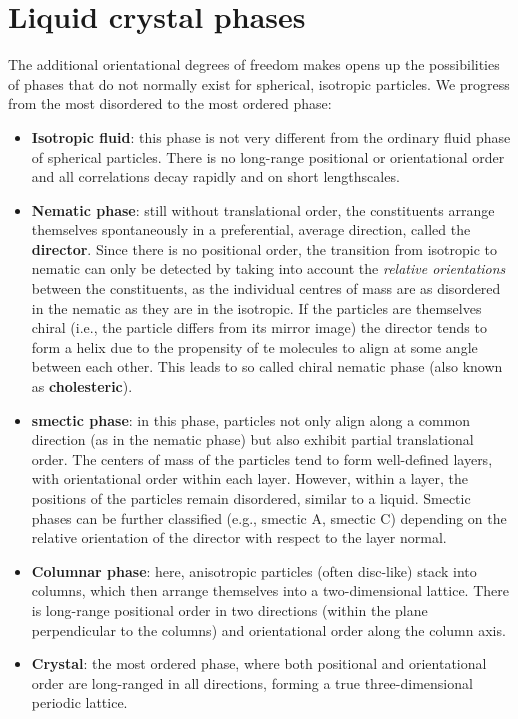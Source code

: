 \documentclass[
  letterpaper,
  enabledeprecatedfontcommands]{report}
\providecommand{\tightlist}{%
  \setlength{\itemsep}{0pt}\setlength{\parskip}{0pt}}
\begin{document}
\section{Liquid crystal phases}\label{liquid-crystal-phases}

The additional orientational degrees of freedom makes opens up the
possibilities of phases that do not normally exist for spherical,
isotropic particles. We progress from the most disordered to the most
ordered phase:

\begin{itemize}
\tightlist
\item
  \textbf{Isotropic fluid}: this phase is not very different from the
  ordinary fluid phase of spherical particles. There is no long-range
  positional or orientational order and all correlations decay rapidly
  and on short lengthscales.
\item
  \textbf{Nematic phase}: still without translational order, the
  constituents arrange themselves spontaneously in a preferential,
  average direction, called the \textbf{director}. Since there is no
  positional order, the transition from isotropic to nematic can only be
  detected by taking into account the \emph{relative orientations}
  between the constituents, as the individual centres of mass are as
  disordered in the nematic as they are in the isotropic. If the
  particles are themselves chiral (i.e., the particle differs from its
  mirror image) the director tends to form a helix due to the propensity
  of te molecules to align at some angle between each other. This leads
  to so called chiral nematic phase (also known as
  \textbf{cholesteric}).
\item
  \textbf{smectic phase}: in this phase, particles not only align along
  a common direction (as in the nematic phase) but also exhibit partial
  translational order. The centers of mass of the particles tend to form
  well-defined layers, with orientational order within each layer.
  However, within a layer, the positions of the particles remain
  disordered, similar to a liquid. Smectic phases can be further
  classified (e.g., smectic A, smectic C) depending on the relative
  orientation of the director with respect to the layer normal.
\item
  \textbf{Columnar phase}: here, anisotropic particles (often disc-like)
  stack into columns, which then arrange themselves into a
  two-dimensional lattice. There is long-range positional order in two
  directions (within the plane perpendicular to the columns) and
  orientational order along the column axis.
\item
  \textbf{Crystal}: the most ordered phase, where both positional and
  orientational order are long-ranged in all directions, forming a true
  three-dimensional periodic lattice.
\end{itemize}
\end{document}
